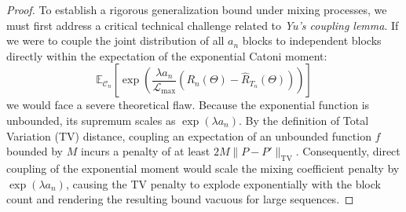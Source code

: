 \begin{proof}
To establish a rigorous generalization bound under mixing processes, we must first address a critical technical challenge related to \emph{Yu's coupling lemma}. If we were to couple the joint distribution of all $a_n$ blocks to independent blocks directly within the expectation of the exponential Catoni moment:
\begin{equation}
    \mathbb{E}_{\mathcal{C}_n} \left[ \exp\left( \frac{\lambda a_n}{\mathcal{L}_{\max}} \left( R_n(\Theta) - \hat{R}_{T_n}(\Theta) \right) \right) \right]
\end{equation}
we would face a severe theoretical flaw. Because the exponential function is unbounded, its supremum scales as $\exp(\lambda a_n)$. By the definition of Total Variation (TV) distance, coupling an expectation of an unbounded function $f$ bounded by $M$ incurs a penalty of at least $2 M \|P - P'\|_{\text{TV}}$. Consequently, direct coupling of the exponential moment would scale the mixing coefficient penalty by $\exp(\lambda a_n)$, causing the TV penalty to explode exponentially with the block count and rendering the resulting bound vacuous for large sequences.


\end{proof}
